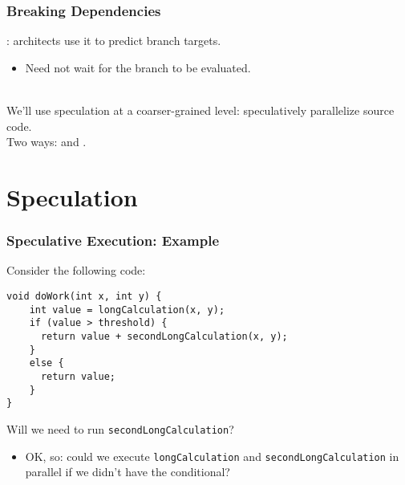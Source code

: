 \begin{frame}
  \frametitle{Breaking Dependencies}

  
  : architects use it to predict
      branch targets.
  \begin{itemize}
    \item Need not wait for the branch to be evaluated.
  \end{itemize}~\\[1em]
  We'll use speculation at a coarser-grained level:
      speculatively parallelize source code.\\[1em]

      Two ways:  and
      .
  
\end{frame}


\section{Speculation}
\begin{frame}[fragile]
  \frametitle{Speculative Execution: Example}

  
Consider the following code:
  
  \begin{lstlisting}
void doWork(int x, int y) {
    int value = longCalculation(x, y);
    if (value > threshold) {
      return value + secondLongCalculation(x, y);
    }
    else {
      return value;
    }
}
  \end{lstlisting}

  Will we need to run {\tt secondLongCalculation}?
  \vfill  
  \begin{itemize}
    \item<2> OK, so: could we execute {\tt longCalculation} and {\tt secondLongCalculation}
      in parallel if we didn't have the conditional?
  \end{itemize}
  
\end{frame}


